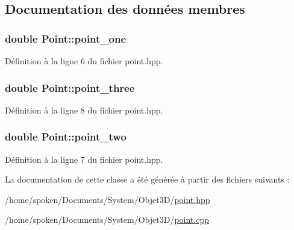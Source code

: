 \subsection{Documentation des données membres}
\hypertarget{class_point_a030522c3949dc71bc4c1f39eb1b0c77e}{
\subsubsection[{point\-\_\-one}]{\setlength{\rightskip}{0pt plus 5cm}double Point\-::point\-\_\-one\hspace{0.3cm}{\ttfamily [private]}}}\label{class_point_a030522c3949dc71bc4c1f39eb1b0c77e}


Définition à la ligne 6 du fichier point.\-hpp.

\hypertarget{class_point_af7cb3c4c0c0f52218ac9ce180df003da}{
\subsubsection[{point\-\_\-three}]{\setlength{\rightskip}{0pt plus 5cm}double Point\-::point\-\_\-three\hspace{0.3cm}{\ttfamily [private]}}}\label{class_point_af7cb3c4c0c0f52218ac9ce180df003da}


Définition à la ligne 8 du fichier point.\-hpp.

\hypertarget{class_point_a7eece7f7413a741137cf32bb763f3987}{
\subsubsection[{point\-\_\-two}]{\setlength{\rightskip}{0pt plus 5cm}double Point\-::point\-\_\-two\hspace{0.3cm}{\ttfamily [private]}}}\label{class_point_a7eece7f7413a741137cf32bb763f3987}


Définition à la ligne 7 du fichier point.\-hpp.



La documentation de cette classe a été générée à partir des fichiers suivants \-:\begin{DoxyCompactItemize}
\item 
/home/spoken/\-Documents/\-System/\-Objet3\-D/\hyperlink{point_8hpp}{point.\-hpp}\item 
/home/spoken/\-Documents/\-System/\-Objet3\-D/\hyperlink{point_8cpp}{point.\-cpp}\end{DoxyCompactItemize}
